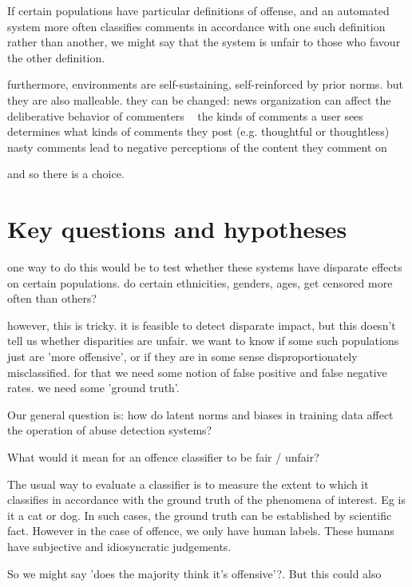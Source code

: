 \documentclass[runningheads,a4paper]{llncs}
\begin{document}
If certain populations have particular definitions of offense, and an automated system more often classifies comments in accordance with one such definition rather than another, we might say that the system is unfair to those who favour the other definition.







furthermore, environments are self-sustaining, self-reinforced by prior norms. but they are also malleable. they can be changed:
news organization can affect the deliberative behavior of commenters ~\cite{stroud2015changing}
the kinds of comments a user sees determines what kinds of comments they post (e.g. thoughtful or thoughtless) ~\cite{sukumaran2011normative}
nasty comments lead to negative perceptions of the content they comment on ~\cite{anderson2014nasty}

and so there is a choice.


\section{Key questions and hypotheses}

one way to do this would be to test whether these systems have disparate effects on certain populations. do certain ethnicities, genders, ages, get censored more often than others?

however, this is tricky. it is feasible to detect disparate impact, but this doesn't tell us whether disparities are unfair. we want to know if some such populations just are 'more offensive', or if they are in some sense disproportionately misclassified. for that we need some notion of false positive and false negative rates. we need some 'ground truth'.

Our general question is: how do latent norms and biases in training data affect the operation of abuse detection systems?

What would it mean for an offence classifier to be fair / unfair?

The usual way to evaluate a classifier is to measure the extent to which it classifies in accordance with the ground truth of the phenomena of interest. Eg is it a cat or dog. In such cases, the ground truth can be established by scientific fact. However in the case of offence, we only have human labels. These humans have subjective and idiosyncratic judgements.

So we might say 'does the majority think it's offensive'?. But this could also
\end{document}
